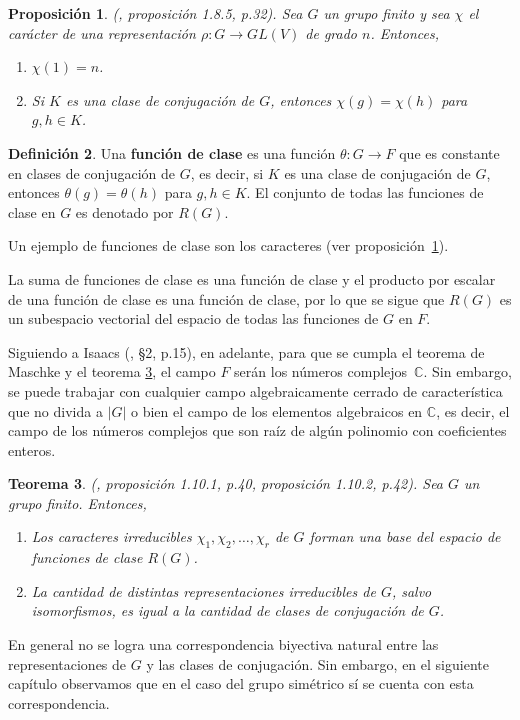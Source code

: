 \documentclass[12pt]{book}
\newtheorem{theorem}{Teorema}[section]
\newtheorem{proposition}[theorem]{Proposición}
\theoremstyle{definition}
\newtheorem{definition}[theorem]{Definición}
\newcounter{in}
\newcounter{ini}
\begin{document}
\begin{proposition}{\normalfont (\cite{sagan2001symmetric}, proposición 1.8.5, p.32)}.
  Sea $G$ un grupo finito y sea $\chi$ el carácter de una
  representación $\rho:G\rightarrow GL(V)$ de grado $n$. Entonces,
  \begin{enumerate}
  \item $\chi(1)=n$.
  \item Si $K$ es una clase de conjugación de $G$, entonces $\chi(g)=\chi(h)$ para $g,h\in K$. 
  \end{enumerate}
\label{carac-const}
\end{proposition}
\begin{definition}
  Una \textbf{función de clase} es una función
  $\theta:G\rightarrow F$ que es constante en clases de
  conjugación de $G$, es decir, si $K$ es una clase de conjugación de
  $G$, entonces $\theta(g)=\theta(h)$ para $g,h\in K$. El conjunto de
  todas las funciones de clase en $G$ es denotado por $R(G)$.
\end{definition} 
Un ejemplo de funciones de clase son los caracteres (ver proposición~\ref{carac-const}).

La suma de funciones de clase es una función de clase y el
producto por escalar de una función de clase es una función de clase,
por lo que se sigue que $R(G)$ es un subespacio vectorial del espacio
de todas las funciones de $G$ en $F$.

Siguiendo a Isaacs (\cite{isaacs}, \S 2, p.15), en adelante, para
que se cumpla el teorema de Maschke y el teorema \ref{no-rep-irr-no-cla-conj}, el campo $F$ serán
los números complejos~$\mathbb{C}$. Sin embargo, se puede trabajar
con cualquier campo algebraicamente cerrado de característica que no
divida a $|G|$ o bien el campo de los elementos algebraicos en
$\mathbb{C}$, es decir, el campo de los números complejos que son raíz
de algún polinomio con coeficientes enteros.

\begin{theorem}{\normalfont (\cite{sagan2001symmetric}, proposición 1.10.1, p.40, proposición 1.10.2, p.42)}.
  \label{no-rep-irr-no-cla-conj}
  Sea $G$ un grupo finito. Entonces,
  \begin{enumerate}
  \item Los caracteres irreducibles
    $\chi_{1},\chi_{2},\ldots,\chi_{r}$ de $G$ forman una base del
    espacio de funciones de clase $R(G)$.
    \item La cantidad de distintas representaciones irreducibles de $G$, salvo
      isomorfismos, es igual a la cantidad de clases de conjugación de $G$.
  \end{enumerate}
\end{theorem}
En general no se logra una correspondencia biyectiva natural entre las
representaciones de $G$ y las clases de conjugación. Sin embargo, en
el siguiente capítulo observamos que en el caso del grupo simétrico sí se cuenta con
esta correspondencia.
\end{document}
